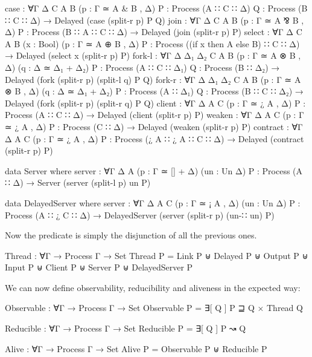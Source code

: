 \begin{AgdaAlign}
\begin{code}[hide]
  case :
    ∀{Γ Δ C A B} (p : Γ ≃ A & B , Δ) {P : Process (A ∷ C ∷ Δ)} {Q : Process (B ∷ C ∷ Δ)} →
    Delayed (case (split-r p) P Q)
  join :
    ∀{Γ Δ C A B} (p : Γ ≃ A ⅋ B , Δ) {P : Process (B ∷ A ∷ C ∷ Δ)} →
    Delayed (join (split-r p) P)
  select :
    ∀{Γ Δ C A B} (x : Bool) (p : Γ ≃ A ⊕ B , Δ) {P : Process ((if x then A else B) ∷ C ∷ Δ)} →
    Delayed (select x (split-r p) P)
  fork-l :
    ∀{Γ Δ Δ₁ Δ₂ C A B} (p : Γ ≃ A ⊗ B , Δ) (q : Δ ≃ Δ₁ + Δ₂)
    {P : Process (A ∷ C ∷ Δ₁)} {Q : Process (B ∷ Δ₂)} →
    Delayed (fork (split-r p) (split-l q) P Q)
  fork-r :
    ∀{Γ Δ Δ₁ Δ₂ C A B} (p : Γ ≃ A ⊗ B , Δ) (q : Δ ≃ Δ₁ + Δ₂)
    {P : Process (A ∷ Δ₁)} {Q : Process (B ∷ C ∷ Δ₂)} →
    Delayed (fork (split-r p) (split-r q) P Q)
  client :
    ∀{Γ Δ A C} (p : Γ ≃ ¿ A , Δ) {P : Process (A ∷ C ∷ Δ)} →
    Delayed (client (split-r p) P)
  weaken :
    ∀{Γ Δ A C} (p : Γ ≃ ¿ A , Δ) {P : Process (C ∷ Δ)} →
    Delayed (weaken (split-r p) P)
  contract :
    ∀{Γ Δ A C} (p : Γ ≃ ¿ A , Δ) {P : Process (¿ A ∷ ¿ A ∷ C ∷ Δ)} →
    Delayed (contract (split-r p) P)

data Server where
  server :
    ∀{Γ Δ A} (p : Γ ≃ [] + Δ) (un : Un Δ) {P : Process (A ∷ Δ)} →
    Server (server (split-l p) un P)

data DelayedServer where
  server :
    ∀{Γ Δ A C} (p : Γ ≃ ¡ A , Δ) (un : Un Δ) {P : Process (A ∷ ¿ C ∷ Δ)} →
    DelayedServer (server (split-r p) (un-∷ un) P)
\end{code}
\end{AgdaAlign}

Now the  predicate is simply the disjunction of all the
previous ones.

\begin{code}
Thread : ∀{Γ} → Process Γ → Set
Thread P = Link P ⊎ Delayed P ⊎ Output P ⊎ Input P ⊎
           Client P ⊎ Server P ⊎ DelayedServer P
\end{code}

We can now define observability, reducibility and aliveness in the expected way:

\begin{code}
Observable : ∀{Γ} → Process Γ → Set
Observable P = ∃[ Q ] P ⊒ Q × Thread Q

Reducible : ∀{Γ} → Process Γ → Set
Reducible P = ∃[ Q ] P ↝ Q

Alive : ∀{Γ} → Process Γ → Set
Alive P = Observable P ⊎ Reducible P
\end{code}


